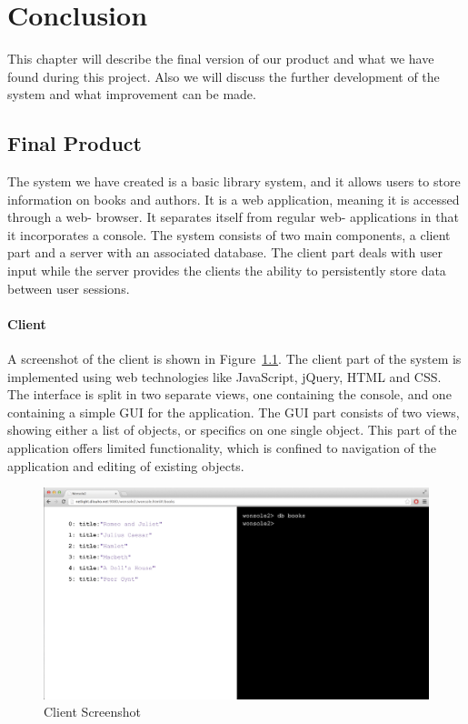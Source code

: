 \chapter{Conclusion}

\minitoc

This chapter will describe the final version of our product and what we have found during this project. Also we will discuss the further development of the system and what improvement can be made.

\clearpage

\section{Final Product}
The system we have created is a basic library system, and it allows users to store information on books and authors. It is a web application, meaning it is accessed through a web- browser. It separates itself from regular web- applications in that it incorporates a console. The system consists of two main components, a client part and a server with an associated database. The client part deals with user input while the server provides the clients the ability to persistently store data between user sessions. 

\subsubsection{Client}
A screenshot of the client is shown in Figure~\ref{figure:wonsoleScreenshot}. The client part of the system is implemented using web technologies like JavaScript, jQuery, HTML and CSS. The interface is split in two separate views, one containing the console, and one containing a simple GUI for the application. The GUI part consists of two views, showing either a list of objects, or specifics on one single object. This part of the application offers limited functionality, which is confined to navigation of the application and editing of existing objects.

\begin{figure}[H]
\centering
\includegraphics[width=5in]{image/wonsoleScreenshot.png}
\caption{Client Screenshot}
\label{figure:wonsoleScreenshot}
\end{figure}

